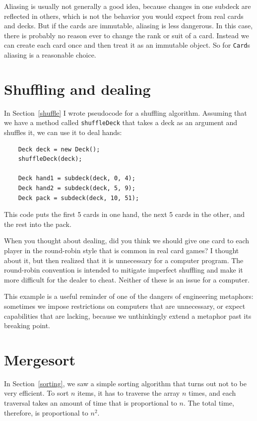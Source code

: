 \documentclass[12pt]{book}
\theoremstyle{exercise}
\begin{document}

Aliasing is usually not generally a good idea, because
changes in one subdeck are reflected in others, which is not the
behavior you would expect from real cards and decks.  But if the
cards are immutable, aliasing is less dangerous.
In this case, there is probably no reason ever to change the
rank or suit of a card.  Instead we can create each card
once and then treat it as an immutable object.  So for {\tt Card}s
aliasing is a reasonable choice.


\section{Shuffling and dealing}

In Section~\ref{shuffle} I wrote pseudocode for a shuffling algorithm.
Assuming that we have a method called {\tt shuffleDeck} that takes
a deck as an argument and shuffles it, we can use it to deal hands:

\begin{lstlisting}
    Deck deck = new Deck();
    shuffleDeck(deck);

    Deck hand1 = subdeck(deck, 0, 4);
    Deck hand2 = subdeck(deck, 5, 9);
    Deck pack = subdeck(deck, 10, 51);
\end{lstlisting}
%
This code puts the first 5 cards in one hand, the next 5 cards
in the other, and the rest into the pack.

When you thought about dealing, did you think we should give one
card to each player in the round-robin style that is common
in real card games?  I thought about it, but then realized that it is
unnecessary for a computer program.  The round-robin convention is
intended to mitigate imperfect shuffling and make it more difficult
for the dealer to cheat.  Neither of these is an issue for a computer.

This example is a useful reminder of one of the dangers of engineering
metaphors: sometimes we impose restrictions on computers that are
unnecessary, or expect capabilities that are lacking, because we
unthinkingly extend a metaphor past its breaking point.


\section {Mergesort}
\label{mergesort}

In Section~\ref{sorting}, we saw a simple sorting algorithm that turns
out not to be very efficient.  To sort $n$ items, it has to
traverse the array $n$ times, and each traversal takes an amount of
time that is proportional to $n$.  The total time, therefore, is
proportional to $n^2$.
\end{document}
